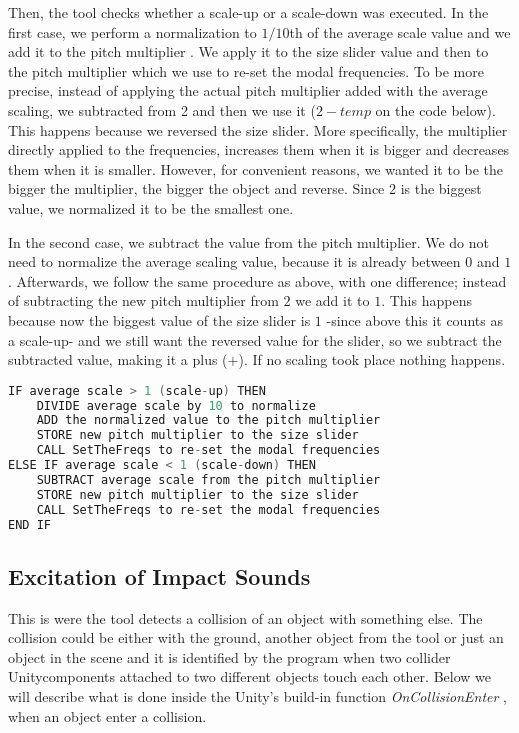 Then, the tool checks whether a scale-up or a scale-down was executed. In the first case, we perform a normalization to $1/10$th of the average scale value and we add it to the pitch multiplier . We apply it to the size slider value and then to the pitch multiplier which we use to re-set the modal frequencies. To be more precise, instead of applying the actual pitch multiplier added with the average scaling, we subtracted from 2 and then we use it ($2-temp$ on the code below). This happens because we reversed the size slider. More specifically, the multiplier directly applied to the frequencies, increases them when it is bigger and decreases them when it is smaller. However, for convenient reasons, we wanted it to be the bigger the multiplier, the bigger the object and reverse. Since $2$ is the biggest value, we normalized it to be the smallest one.

In the second case, we subtract the value from the pitch multiplier. We do not need to normalize the average scaling value, because it is already between $0$ and $1$. Afterwards, we follow the same procedure as above, with one difference; instead of subtracting the new pitch multiplier from $2$ we add it to $1$. This happens because now the biggest value of the size slider is $1$ -since above this it counts as a scale-up- and we still want the reversed value for the slider, so we subtract the subtracted value, making it a plus ($+$). If no scaling took place nothing happens.

\begin{lstlisting}[language=C]
IF average scale > 1 (scale-up) THEN
    DIVIDE average scale by 10 to normalize
    ADD the normalized value to the pitch multiplier
    STORE new pitch multiplier to the size slider
    CALL SetTheFreqs to re-set the modal frequencies
ELSE IF average scale < 1 (scale-down) THEN
    SUBTRACT average scale from the pitch multiplier
    STORE new pitch multiplier to the size slider
    CALL SetTheFreqs to re-set the modal frequencies
END IF
\end{lstlisting}



\subsection{Excitation of Impact Sounds}
This is were the tool detects a collision of an object with something else. The collision could be either with the ground, another object from the tool or just an object in the scene and it is identified by the program when two collider Unity\textregistered components attached to two different objects touch each other. Below we will describe what is done inside the Unity's build-in function \textit{OnCollisionEnter} \cite{bib:unity_doc}, when an object enter a collision.

